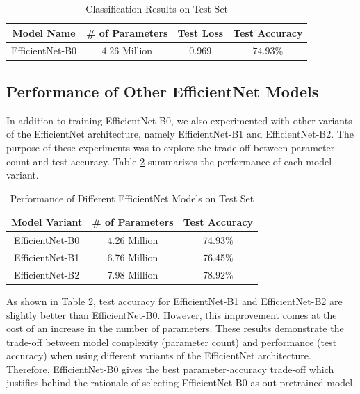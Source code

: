 \documentclass[12pt, a4paper, twoside]{article}
\begin{document}
			\begin{table}
				\begin{center}
						\begin{tabular}{c c c c}
								\hline
								\textbf{Model Name} & \textbf{\# of Parameters} & \textbf{Test Loss} & \textbf{Test Accuracy} \\ \hline
								EfficientNet-B0 & $4.26$ Million & $0.969$ & $74.93$\% \\ \hline
							\end{tabular}
						\caption{Classification Results on Test Set}\label{T:test}
					\end{center}
			\end{table}
			
		\subsection{Performance of Other EfficientNet Models}
			In addition to training EfficientNet-B0, we also experimented with other variants of the EfficientNet architecture, namely EfficientNet-B1 and EfficientNet-B2. The purpose of these experiments was to explore the trade-off between parameter count and test accuracy. Table \ref{T:diff} summarizes the performance of each model variant.
			
			\begin{table}[h]
				\centering
				\begin{tabular}{c c c}
					\hline
					\textbf{Model Variant} & \textbf{\# of Parameters} & \textbf{Test Accuracy} \\ \hline
					EfficientNet-B0 & 4.26 Million & 74.93\% \\ \hline
					EfficientNet-B1 & 6.76 Million & 76.45\% \\ \hline
					EfficientNet-B2 & 7.98 Million & 78.92\% \\ \hline
				\end{tabular}
				\caption{Performance of Different EfficientNet Models on Test Set}
				\label{T:diff}
			\end{table}
			
			As shown in Table \ref{T:diff}, test accuracy for EfficientNet-B1 and EfficientNet-B2 are slightly better than EfficientNet-B0. However, this improvement comes at the cost of an increase in the number of parameters. These results demonstrate the trade-off between model complexity (parameter count) and performance (test accuracy) when using different variants of the EfficientNet architecture. Therefore, EfficientNet-B0 gives the best parameter-accuracy trade-off which justifies behind the rationale of selecting EfficientNet-B0 as out pretrained model. 
			
\end{document}

